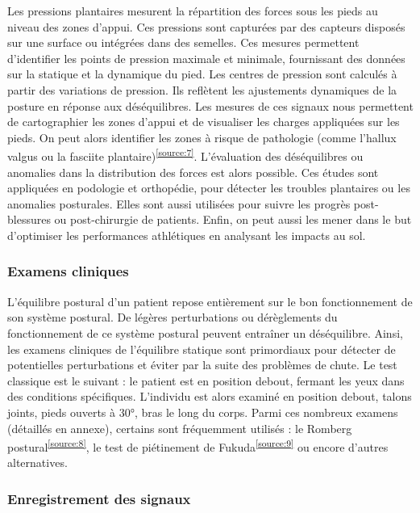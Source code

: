 Les pressions plantaires mesurent la répartition des forces sous les pieds au niveau des zones d’appui. 
Ces pressions sont capturées par des capteurs disposés 
sur une surface ou intégrées dans des semelles. Ces mesures permettent d’identifier les points de pression maximale et minimale, fournissant des données sur la statique et la dynamique du pied.
Les centres de pression sont calculés à partir des variations de pression. 
Ils reflètent les ajustements dynamiques de la posture en réponse aux déséquilibres. 
Les mesures de ces signaux nous permettent de cartographier les zones d'appui et de visualiser les charges appliquées sur les pieds. 
On peut alors identifier les zones à risque de pathologie (comme l’hallux valgus ou la fasciite plantaire)\textsuperscript{\ref{source:7}}. 
L'évaluation des déséquilibres ou anomalies dans la distribution des forces est alors possible. 
Ces études sont appliquées en podologie et orthopédie, pour détecter les troubles plantaires ou les anomalies posturales. 
Elles sont aussi utilisées pour suivre les progrès post-blessures ou post-chirurgie de patients. 
Enfin, on peut aussi les mener dans le but d’optimiser les performances athlétiques en analysant les impacts au sol.

\subsubsection{Examens cliniques}
\label{subsubsec:protocole}

L’équilibre postural d’un patient repose entièrement sur le bon fonctionnement de son système postural. 
De légères perturbations ou dérèglements du fonctionnement de ce système postural peuvent  entraîner un déséquilibre. 
Ainsi, les examens cliniques de l’équilibre statique sont primordiaux pour détecter de potentielles perturbations et éviter par la suite des problèmes de chute. 
Le test classique est le suivant :  le patient est en position debout, fermant les yeux dans des conditions spécifiques.  
L’individu est alors examiné en position debout, talons joints, pieds ouverts à 30°, bras le long du corps. 
Parmi ces nombreux examens (détaillés en annexe), certains sont fréquemment utilisés : le Romberg postural\textsuperscript{\ref{source:8}}, le test de piétinement de Fukuda\textsuperscript{\ref{source:9}} ou encore d’autres alternatives. 

\subsubsection{Enregistrement des signaux}

